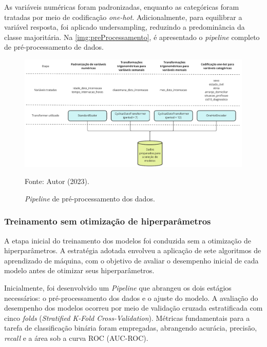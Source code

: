As variáveis numéricas foram padronizadas, enquanto as categóricas foram tratadas por meio de codificação \textit{one-hot}. Adicionalmente, para equilibrar a variável resposta, foi aplicado undersampling, reduzindo a predominância da classe majoritária. Na \autoref{img:preProcessamento}, é apresentado o \textit{pipeline} completo de pré-processamento de dados.

\begin{figure}[H]
	\centering
	\caption{\label{img:preProcessamento}\textit{Pipeline} de pré-processamento dos dados.}
	\includegraphics[scale=0.7]{USPSC-img/preprocessamento.pdf}
	\begin{center}
		Fonte: Autor (2023).
	\end{center}
\end{figure}

\subsubsection{Treinamento sem otimização de hiperparâmetros}\label{sec:treinoSemHiperparametros}

A etapa inicial do treinamento dos modelos foi conduzida sem a otimização de hiperparâmetros. A estratégia adotada envolveu a aplicação de sete algoritmos de aprendizado de máquina, com o objetivo de avaliar o desempenho inicial de cada modelo antes de otimizar seus hiperparâmetros.

Inicialmente, foi desenvolvido um \textit{Pipeline} que abrangeu os dois estágios necessários: o pré-processamento dos dados e o ajuste do modelo. A avaliação do desempenho dos modelos ocorreu por meio de validação cruzada estratificada com cinco \textit{folds} (\textit{Stratified K-Fold Cross-Validation}). Métricas fundamentais para a tarefa de classificação binária foram empregadas, abrangendo acurácia, precisão, \textit{recall} e a área sob a curva ROC (AUC-ROC).

